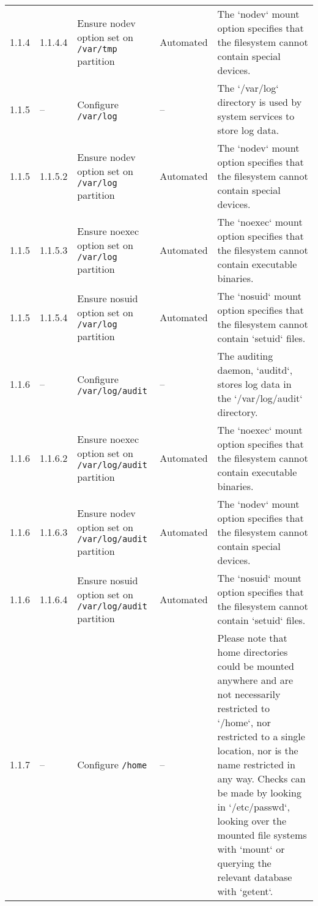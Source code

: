 \begin{table*}[htbp]
\begin{threeparttable}
\begin{tabular}{@{}llp{3cm}p{1.3cm}p{7.45cm}@{}}
1.1.4 & 1.1.4.4 & Ensure nodev option set on \texttt{/var/tmp} partition & Automated &
The `nodev` mount option specifies that the filesystem cannot contain special devices. \\

1.1.5 & -- & Configure \texttt{/var/log} & -- &
The `/var/log` directory is used by system services to store log data. \\

1.1.5 & 1.1.5.2 & Ensure nodev option set on \texttt{/var/log} partition & Automated &
The `nodev` mount option specifies that the filesystem cannot contain special devices. \\

1.1.5 & 1.1.5.3 & Ensure noexec option set on \texttt{/var/log} partition & Automated &
The `noexec` mount option specifies that the filesystem cannot contain executable binaries. \\

1.1.5 & 1.1.5.4 & Ensure nosuid option set on \texttt{/var/log} partition & Automated &
The `nosuid` mount option specifies that the filesystem cannot contain `setuid` files. \\

1.1.6 & -- & Configure \texttt{/var/log/audit} & -- &
The auditing daemon, `auditd`, stores log data in the `/var/log/audit` directory. \\

1.1.6 & 1.1.6.2 & Ensure noexec option set on \texttt{/var/log/audit} partition & Automated &
The `noexec` mount option specifies that the filesystem cannot contain executable binaries. \\

1.1.6 & 1.1.6.3 & Ensure nodev option set on \texttt{/var/log/audit} partition & Automated &
The `nodev` mount option specifies that the filesystem cannot contain special devices. \\

1.1.6 & 1.1.6.4 & Ensure nosuid option set on \texttt{/var/log/audit} partition & Automated &
The `nosuid` mount option specifies that the filesystem cannot contain `setuid` files. \\

1.1.7 & -- & Configure \texttt{/home} & -- &
Please note that home directories could be mounted anywhere and are not necessarily restricted to `/home`, nor restricted to a single location, nor is the name restricted in any way. Checks can be made by looking in `/etc/passwd`, looking over the mounted file systems with `mount` or querying the relevant database with `getent`. \\
\bottomrule
\end{tabular}
\end{threeparttable}
\end{table*}


